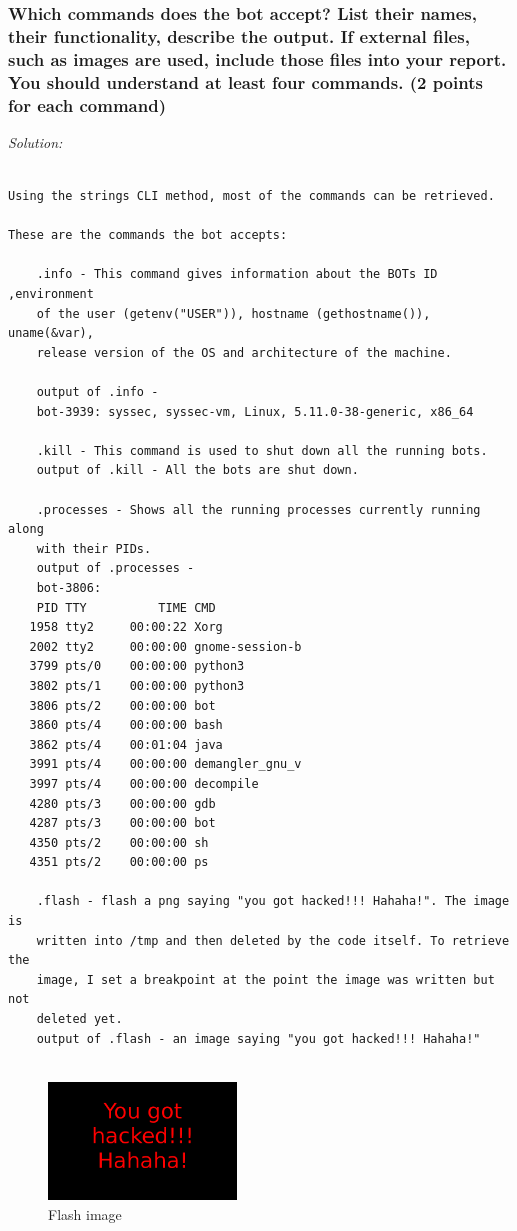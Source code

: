 \documentclass[a4paper,11pt]{article}
\newenvironment{solution}%
{\par{\noindent\small\textit{Solution:}}\vspace{-12pt}\begin{framed}}%
{\end{framed}\par}
\begin{document}
\subsubsection*{Which commands does the bot accept? List their names, their functionality, describe the output. If external files, such as images are used, include those files into your report. You should understand at least four commands.
\ifsolution (2 points for each command) \fi}

\ifsolution
\begin{solution}
\begin{verbatim}

Using the strings CLI method, most of the commands can be retrieved.

These are the commands the bot accepts: 

    .info - This command gives information about the BOTs ID ,environment 
    of the user (getenv("USER")), hostname (gethostname()), uname(&var),
    release version of the OS and architecture of the machine. 
    
    output of .info -
    bot-3939: syssec, syssec-vm, Linux, 5.11.0-38-generic, x86_64

    .kill - This command is used to shut down all the running bots.
    output of .kill - All the bots are shut down.
    
    .processes - Shows all the running processes currently running along
    with their PIDs.
    output of .processes - 
    bot-3806: 
    PID TTY          TIME CMD
   1958 tty2     00:00:22 Xorg
   2002 tty2     00:00:00 gnome-session-b
   3799 pts/0    00:00:00 python3
   3802 pts/1    00:00:00 python3
   3806 pts/2    00:00:00 bot
   3860 pts/4    00:00:00 bash
   3862 pts/4    00:01:04 java
   3991 pts/4    00:00:00 demangler_gnu_v
   3997 pts/4    00:00:00 decompile
   4280 pts/3    00:00:00 gdb
   4287 pts/3    00:00:00 bot
   4350 pts/2    00:00:00 sh
   4351 pts/2    00:00:00 ps
    
    .flash - flash a png saying "you got hacked!!! Hahaha!". The image is
    written into /tmp and then deleted by the code itself. To retrieve the
    image, I set a breakpoint at the point the image was written but not
    deleted yet.
    output of .flash - an image saying "you got hacked!!! Hahaha!"
   
\end{verbatim}
\end{solution}\fi

\begin{figure}[h]
    \centering
    \includegraphics[width=5cm]{tmp_bot_image.png}
    \caption{Flash image}
    \label{fig:galaxy}
\end{figure}
\end{document}
